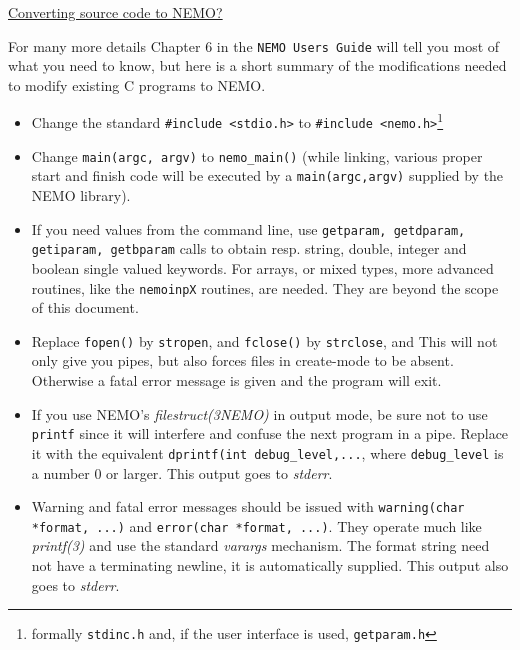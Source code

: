 \centerline{\underline{Converting source code to NEMO?}}

For many more details Chapter 6 in the {\tt NEMO Users Guide} will
tell you most of what you need to know, but here is a short
summary of the modifications needed to modify existing C programs
to NEMO.

\begin{itemize}

\item

Change the standard {\tt \#include <stdio.h>} to 
{\tt \#include <nemo.h>}\footnote{formally
{\tt stdinc.h} and, if the user interface is used,
{\tt getparam.h}}

\item

Change {\tt main(argc, argv)} to
{\tt nemo\_main()} (while linking, various proper start and finish
code will be executed by a {\tt main(argc,argv)} supplied by the
NEMO library).

\item

If you need values from the command line, use
{\tt getparam, getdparam, getiparam, getbparam} calls to obtain
resp. string, double, integer and boolean single valued keywords.
For arrays, or mixed types, more advanced routines, like
the {\tt nemoinpX} routines, are needed. They are beyond the scope
of this document.


\item

Replace {\tt fopen()} by {\tt stropen}, and 
{\tt fclose()} by {\tt strclose}, and 
This will not only give you
pipes, but also forces files in create-mode to be absent. 
Otherwise a fatal error message is given and the program
will exit.

\item

If you use NEMO's {\it filestruct(3NEMO)} in output mode,
be sure not to use {\tt printf} since it will interfere and
confuse the next program in a pipe. Replace it with
the equivalent {\tt dprintf(int debug\_level,...}, where
{\tt debug\_level} is a number 0 or larger. 
This output goes to {\it stderr}.

\item

Warning and fatal error messages should be issued with
{\tt warning(char *format, ...)}
and
{\tt error(char *format, ...)}. They operate much like
{\it printf(3)} and use the standard {\it varargs}
mechanism. The format string need not have a terminating
newline, it is automatically supplied.
This output also goes to {\it stderr}.


\end{itemize}
